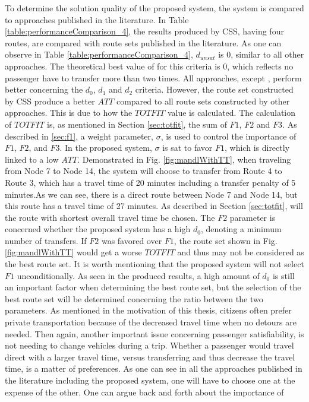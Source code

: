 
To determine the solution quality of the proposed system, the system is compared to approaches published in the literature. In Table \vref{table:performanceComparison_4}, the results produced by CSS, having four routes, are compared with route sets published in the literature. As one can observe in Table \vref{table:performanceComparison_4},  $d_{unsat}$ is 0, similar to all other approaches. The theoretical best value of for this criteria is 0, which reflects no passenger have to transfer more than two times. All approaches, except \citep{mandl79, kidwai98, chakroborty02}, perform better concerning the $d_0$, $d_1$ and $d_2$ criteria. However, the route set constructed by CSS produce a better $ATT$ compared to all route sets constructed by other approaches. This is due to how the $TOTFIT$ value is calculated. The calculation of $TOTFIT$ is, as mentioned in Section \vref{sec:totfit}, the sum of $F1$, $F2$ and $F3$. As described in \vref{sec:f1}, a weight parameter, $\sigma$, is used to control the importance of $F1$, $F2$, and $F3$. In the proposed system, $\sigma$ is sat to favor $F1$, which is directly linked to a low $ATT$. Demonstrated in Fig. \vref{fig:mandlWithTT}, when traveling from Node 7 to Node 14, the system will choose to transfer from Route 4 to Route 3, which has a travel time of 20 minutes including a transfer penalty of 5 minutes.As we can see, there is a direct route between Node 7 and Node 14, but this route has a travel time of 27 minutes. As described in Section \vref{sec:totfit}, will the route with shortest overall travel time be chosen. The $F2$ parameter is concerned whether the proposed system has a high $d_0$, denoting a minimum number of transfers. If $F2$ was favored over $F1$, the route set shown in Fig. \vref{fig:mandlWithTT} would get a worse $TOTFIT$ and thus may not be considered as the best route set. It is worth mentioning that the proposed system will not select $F1$ unconditionally. As seen in the produced results, a high amount of $d_0$ is still an important factor when determining the best route set, but the selection of the best route set will be determined concerning the ratio between the two parameters. As mentioned in the motivation of this thesis, citizens often prefer private transportation because of the decreased travel time when no detours are needed. Then again, another important issue concerning passenger satisfiability, is not needing to change vehicles during a trip. Whether a passenger would travel direct with a larger travel time, versus transferring and thus decrease the travel time, is a matter of preferences. As one can see in all the approaches published in the literature including the proposed system, one will have to choose one at the expense of the other. One can argue back and forth about the importance of 